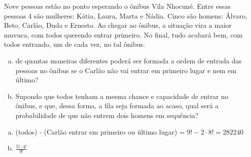 \begin{ex}
 Nove pessoas estão no ponto esperando o ônibus Vila Nhocuné. Entre essas pessoas 4 são mulheres: Kátia, Laura, Marta e Nádia. Cinco são homens: Álvaro, Beto, Carlão, Duda e Ernesto. Ao chegar ao ônibus, a situação vira a maior muvuca, com todos querendo entrar primeiro. No final, tudo acabará bem, com todos entrando, um de cada vez, no tal ônibus.
    \begin{enumerate}[(a)]
    \item de quantas maneiras diferentes poderá ser formada a ordem de entrada das pessoas no ônibus se o Carlão não vai entrar em primeiro lugar e nem em último?
    \item Supondo que todos tenham a mesma chance e capacidade de entrar no ônibus, e que, dessa forma, a fila seja formada ao acaso, qual será a probabilidade de que não entrem dois homens em sequência?
    \end{enumerate}
      \begin{sol}
          \phantom{A} 
        \begin{enumerate} [(a)]
            \item (todos) - (Carlão entrar em primeiro ou último lugar) = $ 9!-2\cdot8!=282240$
            \item $\frac{5!\cdot4!}{9!}$
        \end{enumerate}
      \end{sol}
\end{ex}